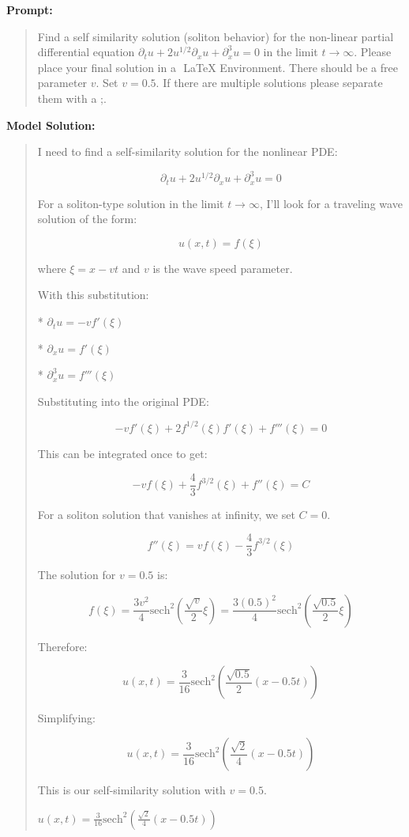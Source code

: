 \documentclass{article}
\begin{document}
\textbf{Prompt:}
\begin{quote}
Find a self similarity solution (soliton behavior) for the non-linear partial differential equation $ \partial_t u + 2u^{1/2} \partial_x u + \partial_x^3 u = 0 $ in the limit $t\to\infty$. Please place your final solution in a $\boxed{}$ LaTeX Environment. There should be a free parameter $v$. Set $v=0.5$. If there are multiple solutions please separate them with a ;.
\end{quote}
\textbf{Model Solution:}
\begin{quote}
I need to find a self-similarity solution for the nonlinear PDE:



$$\partial_t u + 2u^{1/2} \partial_x u + \partial_x^3 u = 0$$



For a soliton-type solution in the limit $t \to \infty$, I'll look for a traveling wave solution of the form:

$$u(x,t) = f(\xi)$$

where $\xi = x - vt$ and $v$ is the wave speed parameter.



With this substitution:

* $\partial_t u = -v f'(\xi)$

* $\partial_x u = f'(\xi)$

* $\partial_x^3 u = f'''(\xi)$



Substituting into the original PDE:

$$-v f'(\xi) + 2f^{1/2}(\xi)f'(\xi) + f'''(\xi) = 0$$



This can be integrated once to get:

$$-v f(\xi) + \frac{4}{3}f^{3/2}(\xi) + f''(\xi) = C$$



For a soliton solution that vanishes at infinity, we set $C = 0$.



$$f''(\xi) = v f(\xi) - \frac{4}{3}f^{3/2}(\xi)$$



The solution for $v = 0.5$ is:



$$f(\xi) = \frac{3v^2}{4} \text{sech}^2\left(\frac{\sqrt{v}}{2}\xi\right) = \frac{3(0.5)^2}{4} \text{sech}^2\left(\frac{\sqrt{0.5}}{2}\xi\right)$$



Therefore:



$$u(x,t) = \frac{3}{16} \text{sech}^2\left(\frac{\sqrt{0.5}}{2}(x - 0.5t)\right)$$



Simplifying:



$$u(x,t) = \frac{3}{16} \text{sech}^2\left(\frac{\sqrt{2}}{4}(x - 0.5t)\right)$$



This is our self-similarity solution with $v = 0.5$.



$\boxed{u(x,t) = \frac{3}{16} \text{sech}^2\left(\frac{\sqrt{2}}{4}(x - 0.5t)\right)}$
\end{quote}
\end{document}
